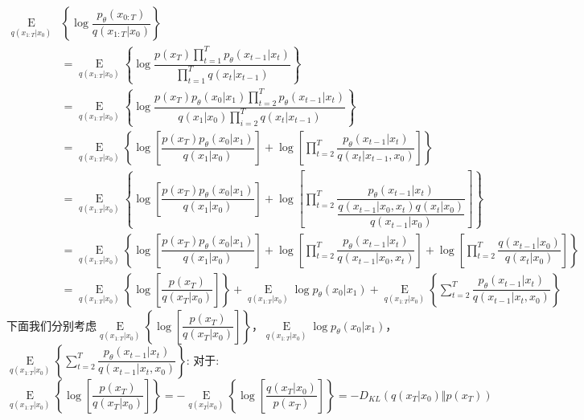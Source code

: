 \documentclass[withoutpreface,bwprint]{cumcmthesis} %
\begin{document}
	\begin{align*}
		\mathop{E}\limits_{ q(x_{1:T}|x_0) }  & \left\{ \log \dfrac{p_{\theta}(x_{0:T})}{q(x_{1:T}|x_0)} \right\}  \\
		& = \mathop{E}\limits_{ q(x_{1:T}|x_0) } 
		\left\{ \log \dfrac{p(x_T) \prod_{t=1}^{T} p_{\theta}(x_{t-1}|x_{t}) }{ \prod_{t=1}^{T} q(x_{t}|x_{t-1}) } \right\} \\
		& = \mathop{E}\limits_{ q(x_{1:T}|x_0) }  \left\{ \log \dfrac{p(x_T) p_{\theta}(x_{0}|x_{1}) \prod_{t=2}^{T} p_{\theta}(x_{t-1}|x_{t})}{q(x_1|x_0) \prod_{i=2}^{T} q(x_t|x_{t-1})} \right\} \\
		& = \mathop{E}\limits_{ q(x_{1:T}|x_0) } \left\{  \log \left[ \dfrac{p(x_T) p_{\theta}(x_{0}|x_{1}) }{q(x_1|x_0)}\right]
			+  \log \left[ \prod_{t=2}^{T} \dfrac{p_{\theta}(x_{t-1}|x_{t})}{q(x_t|x_{t-1},x_0)} \right]
		 \right\} \\
		& = \mathop{E}\limits_{ q(x_{1:T}|x_0) } \left\{  \log \left[ \dfrac{p(x_T) p_{\theta}(x_{0}|x_{1}) }{q(x_1|x_0)}\right]
		+  \log \left[ \prod_{t=2}^{T} \dfrac{p_{\theta}(x_{t-1}|x_{t})}{ \dfrac{q(x_{t-1}|x_0,x_t) q(x_t|x_0) }{q(x_{t-1}|x_0)} } \right]
		\right\} \\
		& = \mathop{E}\limits_{ q(x_{1:T}|x_0) } \left\{  \log \left[ \dfrac{p(x_T) p_{\theta}(x_{0}|x_{1}) }{q(x_1|x_0)}\right] 
		+  \log \left[ \prod_{t=2}^{T} \dfrac{p_{\theta}(x_{t-1}|x_{t})}{ q(x_{t-1}|x_0,x_t)  } \right]
		 + \log  \left[ \prod_{t=2}^{T} \dfrac{q(x_{t-1}|x_0)}{q(x_t|x_0)}  \right]
		\right\} \\
		& = \mathop{E}\limits_{ q(x_{1:T}|x_0) } \left\{  
			\log \left[ \dfrac{p(x_T)}{q(x_T|x_0)} \right] \right\}
			+
			\mathop{E}\limits_{ q(x_{1:T}|x_0) } 
			 \log  p_{\theta}(x_{0}|x_{1}) 
			 +
			\mathop{E}\limits_{ q(x_{1:T}|x_0) } \left\{  
			\sum_{t=2}^{T} \dfrac{p_{\theta}(x_{t-1}|x_{t})}{q(x_{t-1}|x_t,x_0)}
			\right\}
	\end{align*}
	下面我们分别考虑$
			\mathop{E}\limits_{ q(x_{1:T}|x_0) } \left\{ \log \left[ \dfrac{p(x_T)}{q(x_T|x_0)} \right] \right\}
			$，$
			\mathop{E}\limits_{ q(x_{1:T}|x_0) } 
			\log  p_{\theta}(x_{0}|x_{1}) 
			$，$
			\mathop{E}\limits_{ q(x_{1:T}|x_0) } \left\{  
			\sum_{t=2}^{T} \dfrac{p_{\theta}(x_{t-1}|x_{t})}{q(x_{t-1}|x_t,x_0)}
			\right\}
			$:
			对于:
			$$
				\mathop{E}\limits_{ q(x_{1:T}|x_0) } \left\{ \log \left[ \dfrac{p(x_T)}{q(x_T|x_0)} \right] \right\}=- \mathop{E}\limits_{ q(x_{T}|x_0) } \left\{ \log \left[ \dfrac{q(x_T|x_0) }{p(x_T)} \right] \right\} = - D_{KL}(q(x_T|x_0) \Vert p(x_T))	
			$$
			
\end{document}
